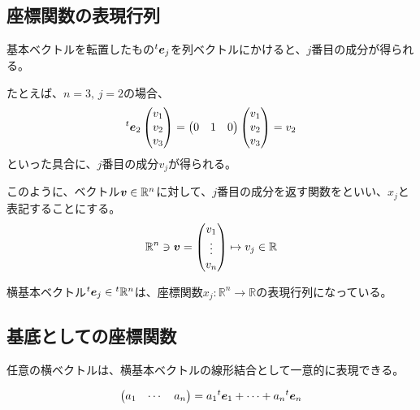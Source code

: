 \documentclass[../../../topic_linear-algebra]{subfiles}
\begin{document}
\subsection{座標関数の表現行列}

基本ベクトルを転置したもの${}^t\vb*{e}_j$を列ベクトルにかけると、$j$番目の成分が得られる。

たとえば、$n=3,\,j=2$の場合、
\begin{equation*}
  {}^t\vb*{e}_2\begin{pmatrix}
    v_1 \\
    v_2 \\
    v_3
  \end{pmatrix} = \begin{pmatrix}
    0 & 1 & 0
  \end{pmatrix}
  \begin{pmatrix}
    v_1 \\
    v_2 \\
    v_3
  \end{pmatrix}
  = v_2
\end{equation*}
といった具合に、$j$番目の成分$v_j$が得られる。

\br

このように、ベクトル$\vb*{v} \in \mathbb{R}^n$に対して、$j$番目の成分を返す関数をといい、$x_j$と表記することにする。
\begin{equation*}
  \mathbb{R}^n \ni \vb*{v} = \begin{pmatrix}
    v_1 \\
    \vdots \\
    v_n
  \end{pmatrix} \mapsto v_j \in \mathbb{R}
\end{equation*}

横基本ベクトル${}^t\vb*{e}_j \in {}^t\mathbb{R}^n$は、座標関数$x_j\colon \mathbb{R}^n \to \mathbb{R}$の表現行列になっている。

\subsection{基底としての座標関数}

任意の横ベクトルは、横基本ベクトルの線形結合として一意的に表現できる。

\begin{equation*}
  \begin{pmatrix}
    a_1 & \cdots & a_n
  \end{pmatrix}
  = a_1 {}^t\vb*{e}_1 + \cdots + a_n {}^t\vb*{e}_n
\end{equation*}
\end{document}
